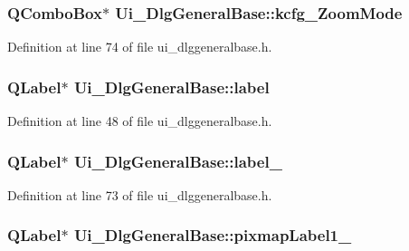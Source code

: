 \hypertarget{classUi__DlgGeneralBase_af20043c0fdfcbff439c8741e096ac60a}{
\subsubsection[{kcfg\+\_\+\+Zoom\+Mode}]{\setlength{\rightskip}{0pt plus 5cm}Q\+Combo\+Box$\ast$ Ui\+\_\+\+Dlg\+General\+Base\+::kcfg\+\_\+\+Zoom\+Mode}}\label{classUi__DlgGeneralBase_af20043c0fdfcbff439c8741e096ac60a}


Definition at line 74 of file ui\+\_\+dlggeneralbase.\+h.

\hypertarget{classUi__DlgGeneralBase_a6580c8bff94e006f767780163d3ca0da}{
\subsubsection[{label}]{\setlength{\rightskip}{0pt plus 5cm}Q\+Label$\ast$ Ui\+\_\+\+Dlg\+General\+Base\+::label}}\label{classUi__DlgGeneralBase_a6580c8bff94e006f767780163d3ca0da}


Definition at line 48 of file ui\+\_\+dlggeneralbase.\+h.

\hypertarget{classUi__DlgGeneralBase_a0b095fda3a8dd7228b68c9fe8515afe3}{
\subsubsection[{label\+\_\+3}]{\setlength{\rightskip}{0pt plus 5cm}Q\+Label$\ast$ Ui\+\_\+\+Dlg\+General\+Base\+::label\+\_}}\label{classUi__DlgGeneralBase_a0b095fda3a8dd7228b68c9fe8515afe3}


Definition at line 73 of file ui\+\_\+dlggeneralbase.\+h.

\hypertarget{classUi__DlgGeneralBase_ad5978e3e0b3caa214086a2dfa6e10a4f}{
\subsubsection[{pixmap\+Label1\+\_\+2}]{\setlength{\rightskip}{0pt plus 5cm}Q\+Label$\ast$ Ui\+\_\+\+Dlg\+General\+Base\+::pixmap\+Label1\+\_}}\label{classUi__DlgGeneralBase_ad5978e3e0b3caa214086a2dfa6e10a4f}



